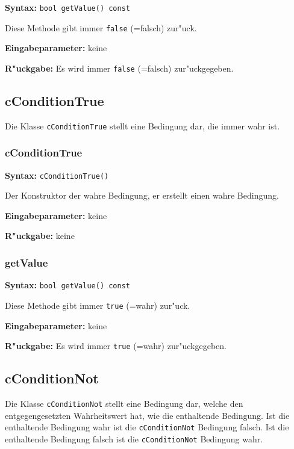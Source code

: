 \textbf{Syntax:} \verb|bool getValue() const|

\bigskip\noindent
Diese Methode gibt immer \verb|false| (=falsch) zur"uck.

\bigskip\noindent
\textbf{Eingabeparameter:} keine

\bigskip\noindent
\textbf{R"uckgabe:} Es wird immer \verb|false| (=falsch) zur"uckgegeben.


\subsection{cConditionTrue}

Die Klasse \verb|cConditionTrue| stellt eine Bedingung dar, die immer wahr ist.

\subsubsection{cConditionTrue}

\textbf{Syntax:} \verb|cConditionTrue()|

\bigskip\noindent
Der Konstruktor der wahre Bedingung, er erstellt einen wahre Bedingung.

\bigskip\noindent
\textbf{Eingabeparameter:} keine

\bigskip\noindent
\textbf{R"uckgabe:} keine


\subsubsection{getValue}

\textbf{Syntax:} \verb|bool getValue() const|

\bigskip\noindent
Diese Methode gibt immer \verb|true| (=wahr) zur"uck.

\bigskip\noindent
\textbf{Eingabeparameter:} keine

\bigskip\noindent
\textbf{R"uckgabe:} Es wird immer \verb|true| (=wahr) zur"uckgegeben.



\subsection{cConditionNot}

Die Klasse \verb|cConditionNot| stellt eine Bedingung dar, welche den entgegengesetzten Wahrheitswert hat, wie die enthaltende Bedingung. Ist die enthaltende Bedingung wahr ist die \verb|cConditionNot| Bedingung falsch. Ist die enthaltende Bedingung falsch ist die \verb|cConditionNot| Bedingung wahr.

